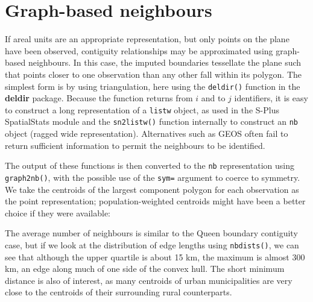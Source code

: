 \documentclass[]{book}
\newenvironment{Shaded}{\begin{snugshade}}{\end{snugshade}}
\newcommand{\CommentTok}[1]{\textcolor[rgb]{0.56,0.35,0.01}{\textit{#1}}}
\newcommand{\DataTypeTok}[1]{\textcolor[rgb]{0.13,0.29,0.53}{#1}}
\newcommand{\KeywordTok}[1]{\textcolor[rgb]{0.13,0.29,0.53}{\textbf{#1}}}
\newcommand{\NormalTok}[1]{#1}
\newcommand{\OperatorTok}[1]{\textcolor[rgb]{0.81,0.36,0.00}{\textbf{#1}}}
\newcommand{\OtherTok}[1]{\textcolor[rgb]{0.56,0.35,0.01}{#1}}
\newcommand{\StringTok}[1]{\textcolor[rgb]{0.31,0.60,0.02}{#1}}
\begin{document}
\hypertarget{graph-based-neighbours}{%
\section{Graph-based neighbours}\label{graph-based-neighbours}}

If areal units are an appropriate representation, but only points on the plane have been observed, contiguity relationships may be approximated using graph-based neighbours. In this case, the imputed boundaries tessellate the plane such that points closer to one observation than any other fall within its polygon. The simplest form is by using triangulation, here using the \texttt{deldir()} function in the \textbf{deldir} package. Because the function returns from \(i\) and to \(j\) identifiers, it is easy to construct a long representation of a \texttt{listw} object, as used in the S-Plus SpatialStats module and the \texttt{sn2listw()} function internally to construct an \texttt{nb} object (ragged wide representation). Alternatives such as GEOS often fail to return sufficient information to permit the neighbours to be identified.

The output of these functions is then converted to the \texttt{nb} representation using \texttt{graph2nb()}, with the possible use of the \texttt{sym=} argument to coerce to symmetry. We take the centroids of the largest component polygon for each observation as the point representation; population-weighted centroids might have been a better choice if they were available:

\begin{Shaded}
\end{Shaded}

The average number of neighbours is similar to the Queen boundary contiguity case, but if we look at the distribution of edge lengths using \texttt{nbdists()}, we can see that although the upper quartile is about 15 km, the maximum is almost 300 km, an edge along much of one side of the convex hull. The short minimum distance is also of interest, as many centroids of urban municipalities are very close to the centroids of their surrounding rural counterparts.
\end{document}
